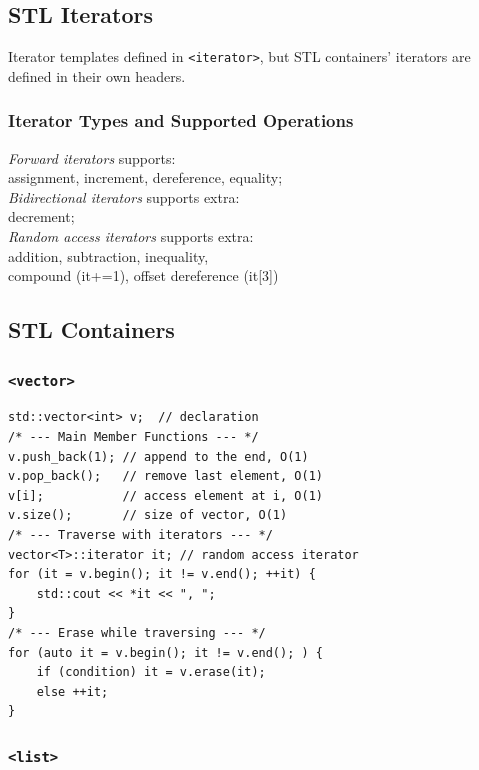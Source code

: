 \subsection*{STL Iterators}

Iterator templates defined in \texttt{<iterator>}, but STL containers'
iterators are defined in their own headers.

\subsubsection*{Iterator Types and Supported Operations}

\emph{Forward iterators} supports:\\
\hfill assignment, increment, dereference, equality;\\
\emph{Bidirectional iterators} supports extra:\\
\hfill decrement;\\
\emph{Random access iterators} supports extra:\\
\hfill addition, subtraction, inequality,\\
\hfill compound (it+=1), offset dereference (it[3])\\

\subsection*{STL Containers}

\subsubsection*{\texttt{<vector>}}

\begin{verbatim}
std::vector<int> v;  // declaration
/* --- Main Member Functions --- */
v.push_back(1); // append to the end, O(1)
v.pop_back();   // remove last element, O(1)
v[i];           // access element at i, O(1)
v.size();       // size of vector, O(1)
/* --- Traverse with iterators --- */
vector<T>::iterator it; // random access iterator
for (it = v.begin(); it != v.end(); ++it) {
    std::cout << *it << ", ";
}
/* --- Erase while traversing --- */
for (auto it = v.begin(); it != v.end(); ) {
    if (condition) it = v.erase(it);
    else ++it;
}
\end{verbatim}
\vspace*{-1.25\baselineskip}

\subsubsection*{\texttt{<list>}}

